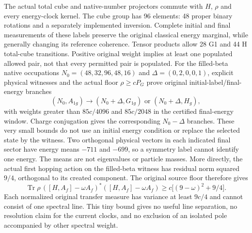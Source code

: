 The actual total cube and native-number projectors commute with $H$,
$\rho$ and every energy-clock kernel. The cube group has 96 elements:
48 proper binary rotations and a separately implemented inversion.
Complete initial and final measurements of these labels preserve the
original classical energy marginal, while generally changing its
reference coherence. Tensor products allow 28 G1 and 44 H total-cube
transitions. Positive original weight implies at least one populated
allowed pair, not that every permitted pair is populated.
For the filled-beta native occupations $N_0=(48,32,96,48,16)$ and
$\Delta=(0,2,0,0,1)$, explicit physical witnesses and the actual floor
$\rho\ge cP_G$ prove original initial-label/final-energy branches
\[
 (N_0,A_{1g})\longrightarrow(N_0+\Delta,G_{1g})\text{ or }(N_0+\Delta,H_g),
\]
with weights greater than $85c/4096$ and $85c/2048$ in the certified
final-energy window. Charge conjugation gives the corresponding
$N_0-\Delta$ branches. These very small bounds do not use an initial
energy condition or replace the selected state by the witness.
Two orthogonal physical vectors in each indicated final sector have
energy means $-711$ and $-699$, so a symmetry label cannot identify
one energy. The means are not eigenvalues or particle masses.
More directly, the actual first hopping action on the filled-beta
witness has residual norm squared $9/4$, orthogonal to its created
component. The original source floor therefore gives
\[
 \operatorname{Tr}\rho\,([H,A_f]-\omega A_f)^*
     ([H,A_f]-\omega A_f)
 \ge c\bigl[(9-\omega)^2+9/4\bigr].
\]
Each normalized original transfer measure has variance at least $9c/4$
and cannot consist of one spectral line. This tiny bound gives no useful
line separation, no resolution claim for the current clocks, and no
exclusion of an isolated pole accompanied by other spectral weight.


